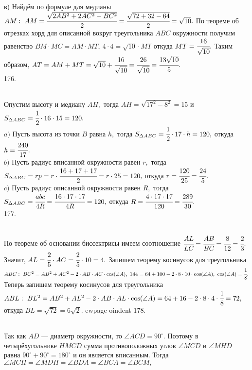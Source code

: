 в) Найдём по формуле для медианы $AM:\ AM=\cfrac{\sqrt{2AB^2+2AC^2-BC^2}}{2}=\cfrac{\sqrt{72+32-64}}{2}=\sqrt{10}.$ По теореме об отрезках хорд для описанной вокруг треугольника $ABC$ окружности получим равенство $BM\cdot MC= AM\cdot MT,\ 4\cdot4=\sqrt{10}\cdot MT$ откуда $MT=\cfrac{16}{\sqrt{10}}.$ Таким образом,
$AT=AM+MT=\sqrt{10}+\cfrac{16}{\sqrt{10}}=\cfrac{26}{\sqrt{10}}=\cfrac{13\sqrt{10}}{5}.$\\
176. \begin{figure}[ht!]
\end{figure}\\
Опустим высоту и медиану $AH,$ тогда $AH=\sqrt{17^2-8^2}=15$ и $S_{\Delta ABC}=\cfrac{1}{2}\cdot16\cdot15=120.$\\
$a)$ Пусть высота из точки $B$ равна $h,$ тогда $S_{\Delta ABC}=\cfrac{1}{2}\cdot17\cdot h=120,$ откуда $h=\cfrac{240}{17}.$\\
$b)$ Пусть радиус вписанной окружности равен $r,$ тогда $S_{\Delta ABC}=rp=r\cdot\cfrac{16+17+17}{2}=r\cdot25=120,$ откуда $r=\cfrac{120}{25}=\cfrac{24}{5}.$\\
$c)$ Пусть радиус описанной окружности равен $R,$ тогда $S_{\Delta ABC}=\cfrac{abc}{4R}=\cfrac{16\cdot17\cdot17}{4R}=120,$ откуда $R=\cfrac{4\cdot17\cdot17}{120}=\cfrac{289}{30}.$\\
177. \begin{figure}[ht!]
\end{figure}\\
По теореме об основании биссектрисы имеем соотношение $\cfrac{AL}{LC}=\cfrac{AB}{BC}=\cfrac{8}{12}=\cfrac{2}{3}.$ Значит, $AL=\cfrac{2}{5}\cdot AC=\cfrac{2}{5}\cdot10=4.$ Запишем теорему косинусов для треугольника $ABC:\ BC^2=AB^2+AC^2-2\cdot AB\cdot AC\cdot \cos(\angle A),\ 144=64+100-2\cdot8\cdot10\cdot
\cos(\angle A),\ \cos(\angle A)=\cfrac{1}{8}.$ Теперь запишем теорему косинусов для треугольника $ABL:\ BL^2=AB^2+AL^2-2\cdot AB\cdot AL\cdot \cos(\angle A)=
64+16-2\cdot8\cdot4\cdot\cfrac{1}{8}=72,$ откуда $BL=\sqrt{72}=6\sqrt{2}.$
ewpage
oindent
178. \begin{figure}[ht!]
\end{figure}\\
Так как $AD$ --- диаметр окружности, то $ \angle ACD = 90^\circ.$ Поэтому в четырёхугольнике $HMCD$ сумма противоположных углов $\angle MCD$ и $\angle MHD$ равна $90^\circ+90^\circ=180^\circ$ и он является вписанным. Тогда $\angle MCH = \angle MDH = \angle BDA =  \angle BCA =  \angle BCM,$
